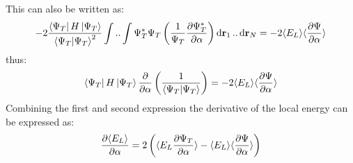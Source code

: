 \documentclass[a4paper, 10pt]{article}
\begin{document}
\begin{appendices}
This can also be written as:
\begin{align}
-2\frac{\bra{\Psi_{T}}H\ket{\Psi_{T}}}{\braket{\Psi_{T}}^{2}}\int..\int \Psi_{T}^{*}\Psi_{T}\left(\frac{1}{\Psi_{T}}\pdv{\Psi_{T}^{*}}{\alpha}\right)\dd{\bold{r}_{1}}..\dd{\bold{r}_{N}}
= -2\langle E_{L} \rangle \langle \pdv{\Psi}{\alpha}\rangle
\end{align}
thus:
\begin{align}
\bra{\Psi_{T}}H\ket{\Psi_{T}}\pdv{\alpha}\left(\frac{1}{\braket{\Psi_{T}}}\right)
= -2\langle E_{L} \rangle \langle \pdv{\Psi}{\alpha}\rangle
\end{align}
Combining the first and second expression the derivative of the local energy can
be expressed as:
\begin{align}
\pdv{\langle E_{L} \rangle }{\alpha} =
2\left(\langle E_{L}\pdv{\Psi_{T}}{\alpha} \rangle -
\langle E_{L} \rangle \langle \pdv{\Psi}{\alpha}\rangle\right)
\end{align}
	\end{appendices}
\end{document}
